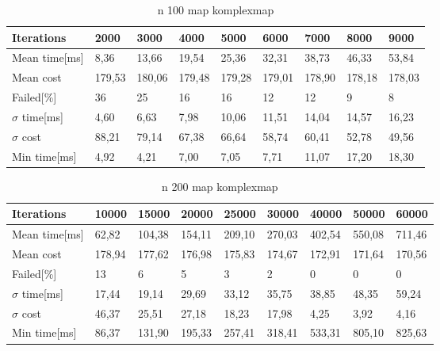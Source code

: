 

\begin{table}[!ht]
	\centering
	\renewcommand{\arraystretch}{1.2}
	\begin{tabular}{|l||l|l|l|l|l|l|l|l|}
		\hline
		Iterations & 2000 & 3000 & 4000 & 5000 & 6000 & 7000 & 8000 & 9000 \\ \hline\hline
		Mean time[ms] & 8,36  & 13,66  & 19,54  & 25,36  & 32,31  & 38,73  & 46,33  & 53,84  \\ \hline
		Mean cost & 179,53  & 180,06  & 179,48  & 179,28  & 179,01  & 178,90  & 178,18  & 178,03  \\ \hline
		Failed[\%] & 36  & 25  & 16  & 16  & 12  & 12  & 9  & 8  \\ \hline
		$\sigma$ time[ms] & 4,60  & 6,63  & 7,98  & 10,06  & 11,51  & 14,04  & 14,57  & 16,23  \\ \hline
		$\sigma$ cost & 88,21  & 79,14  & 67,38  & 66,64  & 58,74  & 60,41  & 52,78  & 49,56  \\ \hline
		Min time[ms] & 4,92  & 4,21  & 7,00  & 7,05  & 7,71  & 11,07  & 17,20  & 18,30  \\ \hline
	\end{tabular}
	\label{tab:pp_precision2}
	\caption{n 100 map komplexmap}
\end{table}

\begin{table}[!ht]
	\centering
	\renewcommand{\arraystretch}{1.2}
	\begin{tabular}{|l||l|l|l|l|l|l|l|l|}
		\hline
		Iterations & 10000 & 15000 & 20000 & 25000 & 30000 & 40000 & 50000 & 60000 \\ \hline\hline
		Mean time[ms] & 62,82 & 104,38 & 154,11 & 209,10 & 270,03  & 402,54 & 550,08  & 711,46  \\ \hline
		Mean cost & 178,94 & 177,62 & 176,98 & 175,83 & 174,67  & 172,91 & 171,64  & 170,56  \\ \hline
		Failed[\%] & 13 & 6 & 5 & 3 & 2  & 0 & 0  & 0  \\ \hline
		$\sigma$ time[ms] & 17,44 & 19,14 & 29,69 & 33,12 & 35,75  & 38,85 & 48,35  & 59,24  \\ \hline
		$\sigma$ cost & 46,37 & 25,51 & 27,18 & 18,23 & 17,98  & 4,25 & 3,92  & 4,16  \\ \hline
		Min time[ms] & 86,37 & 131,90 & 195,33 & 257,41 & 318,41  & 533,31 & 805,10  & 825,63  \\ \hline
	\end{tabular}
	\label{tab:pp_precision3}
	\caption{n 200 map komplexmap}
\end{table}

